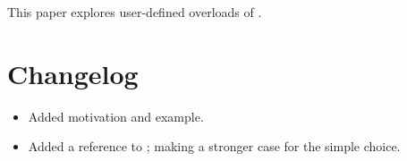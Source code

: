 \newcommand\wgTitle{Making operator?: overloadable}
\newcommand\wgName{Matthias Kretz <m.kretz@gsi.de>}
\newcommand\wgDocumentNumber{D0917R1}
\newcommand\wgGroup{EWG}

\usepackage{mymacros}
\usepackage{wg21}
\usepackage{underscore}



\newcommand\simd[1][]{\type{simd#1}\xspace}
\newcommand\simdT{\type{simd<T>}\xspace}
\newcommand\valuetype{\type{value\_type}\xspace}
\newcommand\referencetype{\type{reference}\xspace}
\newcommand\whereexpression{\type{where\_expression}\xspace}
\newcommand\simdcast{\code{simd\_cast}\xspace}
\newcommand\mask[1][]{\type{simd\_mask#1}\xspace}
\newcommand\maskT{\type{simd\_mask<T>}\xspace}
\newcommand\fixedsizeN{\type{simd\_abi::fixed\_size<N>}\xspace}
\newcommand\fixedsizescoped{\type{simd\_abi::fixed\_size}\xspace}
\newcommand\fixedsize{\type{fixed\_size}\xspace}
\newcommand\simdEP{\code{execution::}\type{simd}\xspace}
\newcommand\seqEP{\code{execution::}\type{seq}\xspace}

\usepackage{pifont}

\newcommand\foralli[1][]{for all \code i $\in$ \code{[0, #1size())}\xspace}
\newcommand\forallmaskedi[1]{%
  for all \code i
  $\in \{j \in \mathbb{N}_0 | j < \code{size()} ⋀ \code{#1[}j\code{]}\}$%
  \xspace%
}
\newcommand\chck{\item[\color{black}\ensuremath{\checkmark}]}
\newcommand\todo{\item[\color{black}\ding{46}] \color{gray}}
\newcommand\itemheader[1]{\item[] \hfill \textcolor{gray}{\textsc{#1}}}


\begin{wgTitlepage}
  This paper explores user-defined overloads of .
\end{wgTitlepage}

\pagestyle{scrheadings}
\addtocounter{section}{-1}
\section{Changelog}
\begin{itemize}
  \item Added  motivation and example.
  \item Added a reference to \cite{P0927R0}; making a stronger case for the simple choice.
\end{itemize}

